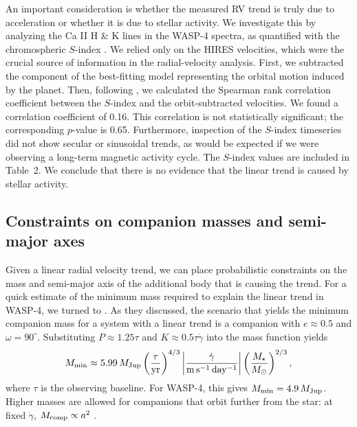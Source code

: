 \documentclass[12pt,twocolumn,tighten,trackchanges]{aastex62}
\begin{document}
An important consideration is whether the measured RV trend is truly
due to acceleration or whether it is due to stellar activity.  We
investigate this by analyzing the Ca II H \& K lines in the WASP-4
spectra, as quantified with the chromospheric $S$-index
\citep{wright_chromospheric_2004}.  We relied only on the HIRES
velocities, which were the crucial source of information in the
radial-velocity analysis.  First, we subtracted the component of the
best-fitting model representing the orbital motion induced by the
planet.  Then, following
\citet{bryan_statistics_2016,bryan_excess_2019}, we calculated the
Spearman rank correlation coefficient between the $S$-index and the
orbit-subtracted velocities.  We found a correlation coefficient of
0.16. This correlation is not statistically significant; the
corresponding $p$-value is 0.65.  Furthermore, inspection of the
$S$-index timeseries did not show secular or sinusoidal trends, as
would be expected if we were observing a long-term magnetic activity
cycle.  The $S$-index values are included in Table~2.  We conclude
that there is no evidence that the linear trend is caused by stellar
activity.

\subsection{Constraints on companion masses and semi-major axes}

Given a linear radial velocity trend, we can place probabilistic
constraints on the mass and semi-major axis of the additional body
that is causing the trend.  For a quick estimate of the minimum mass
required to explain the linear trend in WASP-4, we turned to
\citet{feng_california_2015}.  As they discussed, the scenario that
yields the minimum companion mass for a system with a linear trend is
a companion with $e\approx0.5$ and $\omega=90^\circ$.  Substituting
$P\approx 1.25\tau$ and $K \approx 0.5\tau \dot{\gamma}$ into the mass
function \citep[{\it e.g.},][]{wright_efficient_2009} yields
\begin{equation}
 M_{\rm min} \approx 5.99\,M_{\rm Jup}
  \left( \frac{\tau}{{\rm yr}} \right)^{4/3}
  \left| \frac{\dot{\gamma}}{{\rm m\,s^{-1}\,day^{-1}}} \right|
  \left( \frac{M_\star}{{M_\odot}} \right)^{2/3},
\end{equation}
where $\tau$ is the observing baseline.  For WASP-4, this gives
$M_{\rm min} = 4.9\,M_{\rm Jup}$.  Higher masses are allowed for
companions that orbit further from the star: at fixed $\dot{\gamma}$,
$M_{\rm comp} \propto a^2$
\citep{torres_substellar_1999,liu_crossing_2002}.
\end{document}
